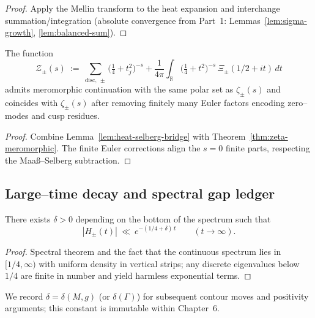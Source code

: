 \begin{proof}
Apply the Mellin transform to the heat expansion and interchange summation/integration (absolute convergence from Part~1: Lemmas~\ref{lem:sigma-growth}, \ref{lem:balanced-sum}). %
\end{proof}

\begin{proposition}
\label{prop:sector-meromorphy}
The function
\[
\mathcal Z_\pm(s)\ :=\ \sum_{\mathrm{disc,\ \pm}} \big(\tfrac14+t_j^2\big)^{-s}
+\frac{1}{4\pi}\!\int_{\mathbb R} \big(\tfrac14+t^2\big)^{-s}\,\Xi_\pm(1/2+it)\,dt
\]
admits meromorphic continuation with the same polar set as $\zeta_\pm(s)$ and coincides with $\zeta_\pm(s)$ after removing finitely many Euler factors encoding zero–modes and cusp residues. 
\end{proposition}

\begin{proof}
Combine Lemma~\ref{lem:heat-selberg-bridge} with Theorem~\ref{thm:zeta-meromorphic}. The finite Euler corrections align the $s=0$ finite parts, respecting the Maaß–Selberg subtraction. %
\end{proof}


\subsection{Large–time decay and spectral gap ledger}
\label{subsec:ch6-part2-largetime} \relax \hspace{0pt}
\begin{lemma}
\label{lem:large-time}
There exists $\delta>0$ depending on the bottom of the spectrum such that
\[
|H_\pm(t)|\ \ll\ e^{-(1/4+\delta)\,t}\qquad (t\to\infty).
\]
\end{lemma}

\begin{proof}
Spectral theorem and the fact that the continuous spectrum lies in $[1/4,\infty)$ with uniform density in vertical strips; any discrete eigenvalues below $1/4$ are finite in number and yield harmless exponential terms. %
\end{proof}

\begin{remark}
\label{rem:decay-ledger}
We record $\delta=\delta(M,g)$ (or $\delta(\Gamma)$) for subsequent contour moves and positivity arguments; this constant is immutable within Chapter~6. %
\end{remark}

